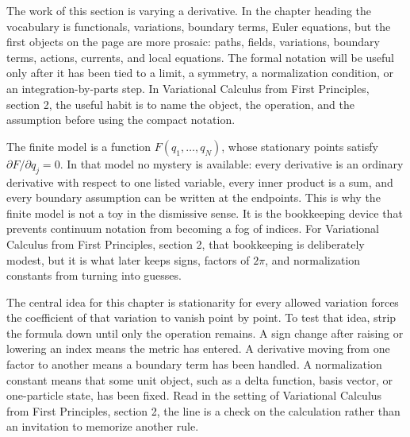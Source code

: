 











The work of this section is varying a derivative.  In the chapter heading the vocabulary is functionals, variations, boundary terms, Euler equations, but the first objects on the page are more prosaic: paths, fields, variations, boundary terms, actions, currents, and local equations.  The formal notation will be useful only after it has been tied to a limit, a symmetry, a normalization condition, or an integration-by-parts step.  In Variational Calculus from First Principles, section 2, the useful habit is to name the object, the operation, and the assumption before using the compact notation.

The finite model is a function \(F(q_1,\ldots,q_N)\), whose stationary points satisfy \( \partial F/\partial q_j=0 \).  In that model no mystery is available: every derivative is an ordinary derivative with respect to one listed variable, every inner product is a sum, and every boundary assumption can be written at the endpoints.  This is why the finite model is not a toy in the dismissive sense.  It is the bookkeeping device that prevents continuum notation from becoming a fog of indices.  For Variational Calculus from First Principles, section 2, that bookkeeping is deliberately modest, but it is what later keeps signs, factors of \(2\pi\), and normalization constants from turning into guesses.

The central idea for this chapter is stationarity for every allowed variation forces the coefficient of that variation to vanish point by point.  To test that idea, strip the formula down until only the operation remains.  A sign change after raising or lowering an index means the metric has entered.  A derivative moving from one factor to another means a boundary term has been handled.  A normalization constant means that some unit object, such as a delta function, basis vector, or one-particle state, has been fixed.  Read in the setting of Variational Calculus from First Principles, section 2, the line is a check on the calculation rather than an invitation to memorize another rule.

